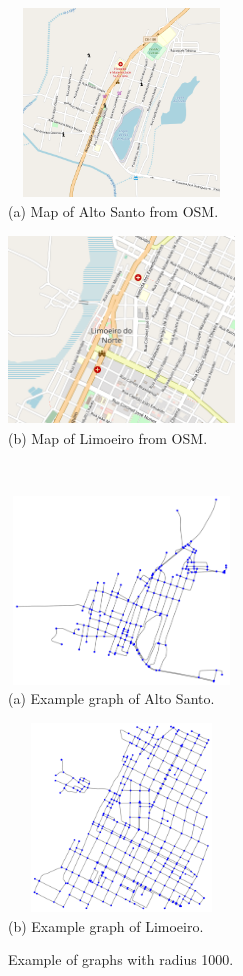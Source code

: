 \documentclass[a4paper,11pt]{article}
\begin{document}
\begin{figure}[!ht]
  \begin{minipage}[c]{.6\textwidth}
    \includegraphics[width=6cm, height=5cm]{alto-santo-osm.png} \\
    (a) Map of Alto Santo from OSM.
  \end{minipage}
  \begin{minipage}[c]{.6\textwidth}
    \includegraphics[width=6cm, height=5cm]{limoeiro-osm.png} \\
    (b) Map of Limoeiro from OSM.
  \end{minipage}
  \\
  \begin{minipage}[c]{.6\textwidth}
    \includegraphics[width=6cm, height=5cm]{graph-alto-santo.png} \\
    (a) Example graph of Alto Santo.
  \end{minipage}
  \begin{minipage}[c]{.6\textwidth}
    \includegraphics[width=6cm, height=5cm]{graph-limoeiro.png} \\
    (b) Example graph of Limoeiro.
  \end{minipage}
  \caption{\label{fig:graph-examples} Example of graphs with radius 1000.}
\end{figure}
\end{document}
